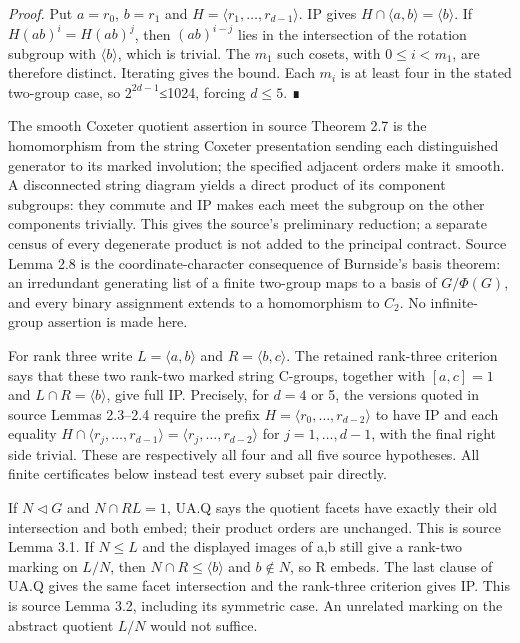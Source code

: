 \emph{Proof.} Put \(a=r_{0}\), \(b=r_{1}\) and \(H=\langle r_{1},\ldots,r_{d-1}\rangle\). IP gives \(H\cap \langle a,b\rangle=\langle b\rangle\). If \(H(ab)^{i}=H(ab)^{j}\), then \((ab)^{i-j}\) lies in the intersection of the rotation subgroup with \(\langle b\rangle\), which is trivial. The \(m_{1}\) such cosets, with \(0\le i<m_{1}\), are therefore distinct. Iterating gives the bound. Each \(m_{i}\) is at least four in the stated two-group case, so \(2^{2d-1}\)≤1024, forcing \(d\le 5\). ∎

The smooth Coxeter quotient assertion in source Theorem 2.7 is the homomorphism from the string Coxeter presentation sending each distinguished generator to its marked involution; the specified adjacent orders make it smooth. A disconnected string diagram yields a direct product of its component subgroups: they commute and IP makes each meet the subgroup on the other components trivially. This gives the source's preliminary reduction; a separate census of every degenerate product is not added to the principal contract. Source Lemma 2.8 is the coordinate-character consequence of Burnside's basis theorem: an irredundant generating list of a finite two-group maps to a basis of \(G/\Phi(G)\), and every binary assignment extends to a homomorphism to \(C_{2}\). No infinite-group assertion is made here.

For rank three write \(L=\langle a,b\rangle\) and \(R=\langle b,c\rangle\). The retained rank-three criterion says that these two rank-two marked string C-groups, together with \([a,c]=1\) and \(L\cap R=\langle b\rangle\), give full IP. Precisely, for \(d=4\) or 5, the versions quoted in source Lemmas 2.3--2.4 require the prefix \(H=\langle r_{0},\ldots,r_{d-2}\rangle\) to have IP and each equality \(H\cap \langle r_{j},\ldots,r_{d-1}\rangle=\langle r_{j},\ldots,r_{d-2}\rangle\) for \(j=1,\ldots,d-1\), with the final right side trivial. These are respectively all four and all five source hypotheses. All finite certificates below instead test every subset pair directly.

If \(N\lhd G\) and \(N\cap RL=1\), UA.Q says the quotient facets have exactly their old intersection and both embed; their product orders are unchanged. This is source Lemma 3.1. If \(N\le L\) and the displayed images of a,b still give a rank-two marking on \(L/N\), then \(N\cap R\le \langle b\rangle\) and \(b\notin N\), so R embeds. The last clause of UA.Q gives the same facet intersection and the rank-three criterion gives IP. This is source Lemma 3.2, including its symmetric case. An unrelated marking on the abstract quotient \(L/N\) would not suffice.

